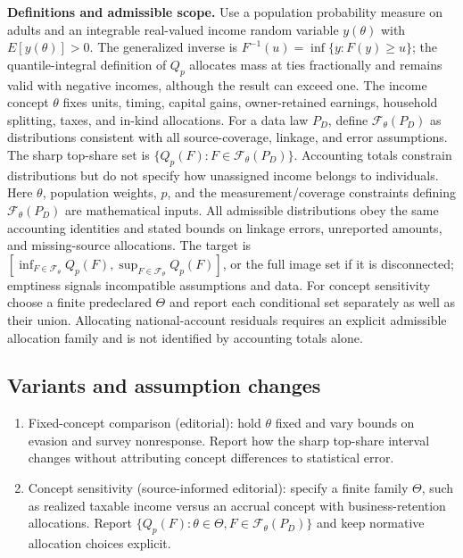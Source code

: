 \documentclass[11pt,a4paper]{article}
\begin{document}
\textbf{Definitions and admissible scope.} Use a population probability measure on adults and an integrable real-valued income random variable \(y(\theta)\) with \(E[y(\theta)]>0\). The generalized inverse is \(F^{-1}(u)=\inf\{y:F(y)\ge u\}\); the quantile-integral definition of \(Q_p\) allocates mass at ties fractionally and remains valid with negative incomes, although the result can exceed one. The income concept \(\theta\) fixes units, timing, capital gains, owner-retained earnings, household splitting, taxes, and in-kind allocations. For a data law \(P_D\), define \(\mathcal F_\theta(P_D)\) as distributions consistent with all source-coverage, linkage, and error assumptions. The sharp top-share set is \(\{Q_p(F):F\in\mathcal F_\theta(P_D)\}\). Accounting totals constrain distributions but do not specify how unassigned income belongs to individuals. Here \(\theta\), population weights, \(p\), and the measurement/coverage constraints defining \(\mathcal F_\theta(P_D)\) are mathematical inputs. All admissible distributions obey the same accounting identities and stated bounds on linkage errors, unreported amounts, and missing-source allocations. The target is \([\inf_{F\in\mathcal F_\theta}Q_p(F),\sup_{F\in\mathcal F_\theta}Q_p(F)]\), or the full image set if it is disconnected; emptiness signals incompatible assumptions and data. For concept sensitivity choose a finite predeclared \(\Theta\) and report each conditional set separately as well as their union. Allocating national-account residuals requires an explicit admissible allocation family and is not identified by accounting totals alone.
\subsection*{Variants and assumption changes}
\begin{enumerate}
\item Fixed-concept comparison (editorial): hold \(\theta\) fixed and vary bounds on evasion and survey nonresponse. Report how the sharp top-share interval changes without attributing concept differences to statistical error.
\item Concept sensitivity (source-informed editorial): specify a finite family \(\Theta\), such as realized taxable income versus an accrual concept with business-retention allocations. Report \(\{Q_p(F):\theta\in\Theta,F\in\mathcal F_\theta(P_D)\}\) and keep normative allocation choices explicit.
\end{enumerate}
\end{document}
